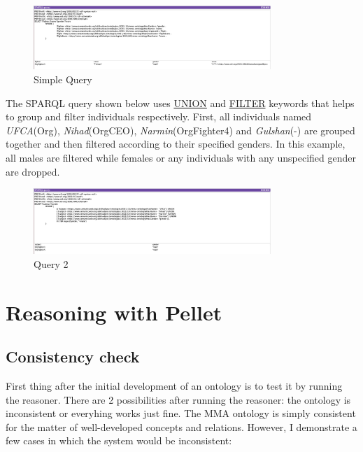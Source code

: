 \documentclass[a4paper]{article}
\begin{document}
\begin{figure}[H]
	\centering
	\includegraphics[width=0.8\textwidth]{resources/sparql1.png}
	\caption{Simple Query}
	\label{fig:sparql1}
\end{figure}

The SPARQL query shown below uses \underline{UNION} and \underline{FILTER} keywords that helps to group and filter individuals respectively. First, all individuals named \textit{UFCA}(Org), 
\textit{Nihad}(OrgCEO), \textit{Narmin}(OrgFighter4) and \textit{Gulshan}(-) are grouped together and then filtered according to their specified genders. In this example, all males are filtered while 
females or any individuals with any unspecified gender are dropped.

\begin{figure}[H]
	\centering
	\includegraphics[width=0.8\textwidth]{resources/sparql3.png}
	\caption{Query 2}
	\label{fig:sparql3}
\end{figure}

\section{Reasoning with Pellet}
\subsection{Consistency check}
First thing after the initial development of an ontology is to test it by running the reasoner. There are 2 possibilities after running the reasoner: the ontology is inconsistent or everyhing works 
just fine. The MMA ontology is simply consistent for the matter of well-developed concepts and relations. However, I demonstrate a few cases in which the system would be inconsistent:
\end{document}
